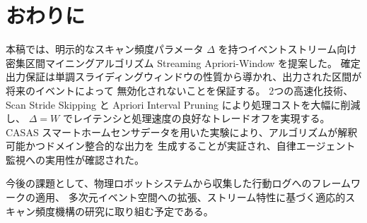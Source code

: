 \section{おわりに}

本稿では、明示的なスキャン頻度パラメータ $\Delta$ を持つイベントストリーム向け密集区間マイニングアルゴリズム
Streaming Apriori-Window を提案した。
確定出力保証は単調スライディングウィンドウの性質から導かれ、出力された区間が将来のイベントによって
無効化されないことを保証する。
2つの高速化技術、Scan Stride Skipping と Apriori Interval Pruning により処理コストを大幅に削減し、
$\Delta = W$ でレイテンシと処理速度の良好なトレードオフを実現する。
CASAS スマートホームセンサデータを用いた実験により、アルゴリズムが解釈可能かつドメイン整合的な出力を
生成することが実証され、自律エージェント監視への実用性が確認された。

今後の課題として、物理ロボットシステムから収集した行動ログへのフレームワークの適用、
多次元イベント空間への拡張、ストリーム特性に基づく適応的スキャン頻度機構の研究に取り組む予定である。
